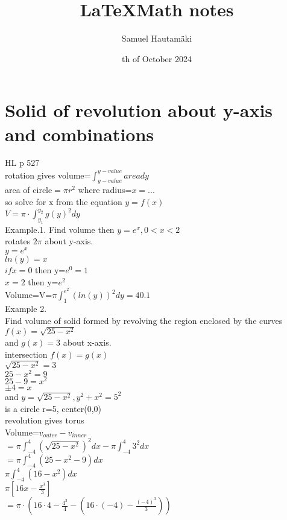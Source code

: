 \documentclass{article}
\title{\LaTeX Math notes}
\author{Samuel Hautamäki}
\date{th of October 2024}
\begin{document}
  \maketitle
   
  \section{Solid of revolution about y-axis and combinations}
  HL p 527\\
  rotation gives volume=$\int_{y-value}^{y-value}area dy$\\
  area of circle$=\pi r^2$ where radius=$x=...$\\
  so solve for x from the equation $y=f(x)$\\
  $V=\pi\cdot \int_{y_1}^{y_2}g(y)^2 dy$\\
  Example.1. Find volume then $y=e^x, 0<x<2$\\
  rotates $2\pi$ about y-axis.\\
  $y=e^x$\\
  $ln(y)=x$\\
  $if x=0$ then y=$e^0=1$\\
  $x=2$ then y=$e^2$\\
  Volume=V=$\pi\int_{1}^{e^2}(ln(y))^2dy=40.1$\\
  Example 2.\\
  Find volume of solid formed by revolving the region enclosed by the curves $f(x)=\sqrt{25-x^2}$\\
  and $g(x)=3$ about x-axis.\\
  intersection $f(x)=g(x)$\\  
  $\sqrt{25-x^2}=3$\\
  $25-x^2=9$\\
  $25-9=x^2$\\
  $\pm4=x$\\
  and $y=\sqrt{25-x^2}, y^2+x^2=5^2$\\
  is a circle r=5, center(0,0)\\
  revolution gives torus\\
  Volume=$v_{outer}-v_{inner}$\\
  $=\pi\int_{-4}^{4}(\sqrt{25-x^2})^2dx-\pi\int_{-4}^{4}3^2dx$\\
  $=\pi\int_{-4}^{4}(25-x^2-9)dx$\\
  $\pi\int_{-4}^{4}(16-x^2)dx$\\
  $\pi[16x-\frac{x^3}{3}]$\\
  $=\pi\cdot(16\cdot4-\frac{4^3}{4}-(16\cdot(-4)-\frac{(-4)^3}{3}))$\\
\end{document}
